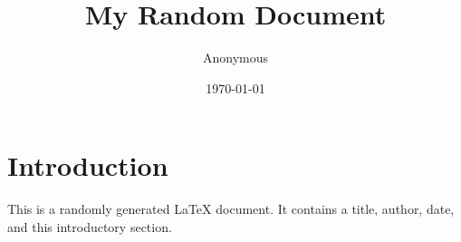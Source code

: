 \documentclass{article}
\title{My Random Document}
\author{Anonymous}
\date{\today}
\begin{document}
\maketitle

\section{Introduction}
This is a randomly generated LaTeX document. It contains a title, author, date, and this introductory section.
\end{document}
